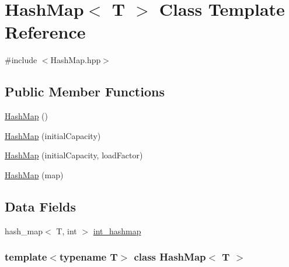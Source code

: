 \hypertarget{classHashMap}{\section{\-Hash\-Map$<$ \-T $>$ \-Class \-Template \-Reference}
\label{classHashMap}
}


{\ttfamily \#include $<$\-Hash\-Map.\-hpp$>$}

\subsection*{\-Public \-Member \-Functions}
\begin{DoxyCompactItemize}
\item 
\hyperlink{classHashMap_ade0749c82229d4055e6d7657cc5315e1}{\-Hash\-Map} ()
\item 
\hyperlink{classHashMap_a122b30a4ab7bc290c24a3bc1f332d329}{\-Hash\-Map} (initial\-Capacity)
\item 
\hyperlink{classHashMap_a855ee1fb57d407373fec1b54f2d42a04}{\-Hash\-Map} (initial\-Capacity, load\-Factor)
\item 
\hyperlink{classHashMap_aadfbc47138dad2cf8de0acce2385d19c}{\-Hash\-Map} (map)
\end{DoxyCompactItemize}
\subsection*{\-Data \-Fields}
\begin{DoxyCompactItemize}
\item 
hash\-\_\-map$<$ \-T, int $>$ \hyperlink{classHashMap_a2b6bacf8f358c4ffab078168b7b9eb63}{int\-\_\-hashmap}
\end{DoxyCompactItemize}
\subsubsection*{template$<$typename T$>$ class Hash\-Map$<$ T $>$}



